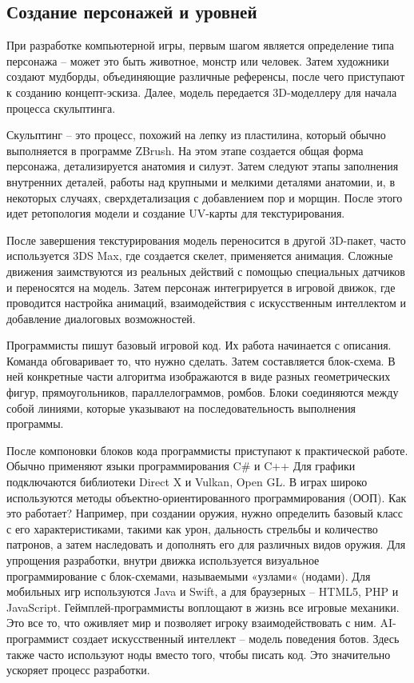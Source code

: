 \subsection{Создание персонажей и уровней}

При разработке компьютерной игры, первым шагом является определение типа персонажа – может это быть животное, монстр или человек. Затем художники создают мудборды, объединяющие различные референсы, после чего приступают к созданию концепт-эскиза. Далее, модель передается 3D-моделлеру для начала процесса скульптинга.\newline

Скульптинг – это процесс, похожий на лепку из пластилина, который обычно выполняется в программе ZBrush. На этом этапе создается общая форма персонажа, детализируется анатомия и силуэт. Затем следуют этапы заполнения внутренних деталей, работы над крупными и мелкими деталями анатомии, и, в некоторых случаях, сверхдетализация с добавлением пор и морщин. После этого идет ретопология модели и создание UV-карты для текстурирования.\newline

После завершения текстурирования модель переносится в другой 3D-пакет, часто используется 3DS Max, где создается скелет, применяется анимация. Сложные движения заимствуются из реальных действий с помощью специальных датчиков и переносятся на модель. Затем персонаж интегрируется в игровой движок, где проводится настройка анимаций, взаимодействия с искусственным интеллектом и добавление диалоговых возможностей.\newline

Программисты пишут базовый игровой код. Их работа начинается с описания. Команда обговаривает то, что нужно сделать. Затем составляется блок-схема. В ней конкретные части алгоритма изображаются в виде разных геометрических фигур, прямоугольников, параллелограммов, ромбов. Блоки соединяются между собой линиями, которые указывают на последовательность выполнения программы.\newline

После компоновки блоков кода программисты приступают к практической работе. Обычно применяют языки программирования C# и C++  Для графики подключаются библиотеки Direct X и Vulkan, Open GL.
В играх широко используются методы объектно-ориентированного программирования (ООП). Как это работает? Например, при создании оружия, нужно определить базовый класс с его характеристиками, такими как урон, дальность стрельбы и количество патронов, а затем наследовать и дополнять его для различных видов оружия.
Для упрощения разработки, внутри движка используется визуальное программирование с блок-схемами, называемыми «узлами« (нодами). Для мобильных игр используются Java и Swift, а для браузерных – HTML5, PHP и JavaScript.\newline
Геймплей-программисты воплощают в жизнь все игровые механики. Это все то, что оживляет мир и позволяет игроку взаимодействовать с ним. AI-программист создает искусственный интеллект – модель поведения ботов. Здесь также часто используют ноды вместо того, чтобы писать код. Это значительно ускоряет процесс разработки.

